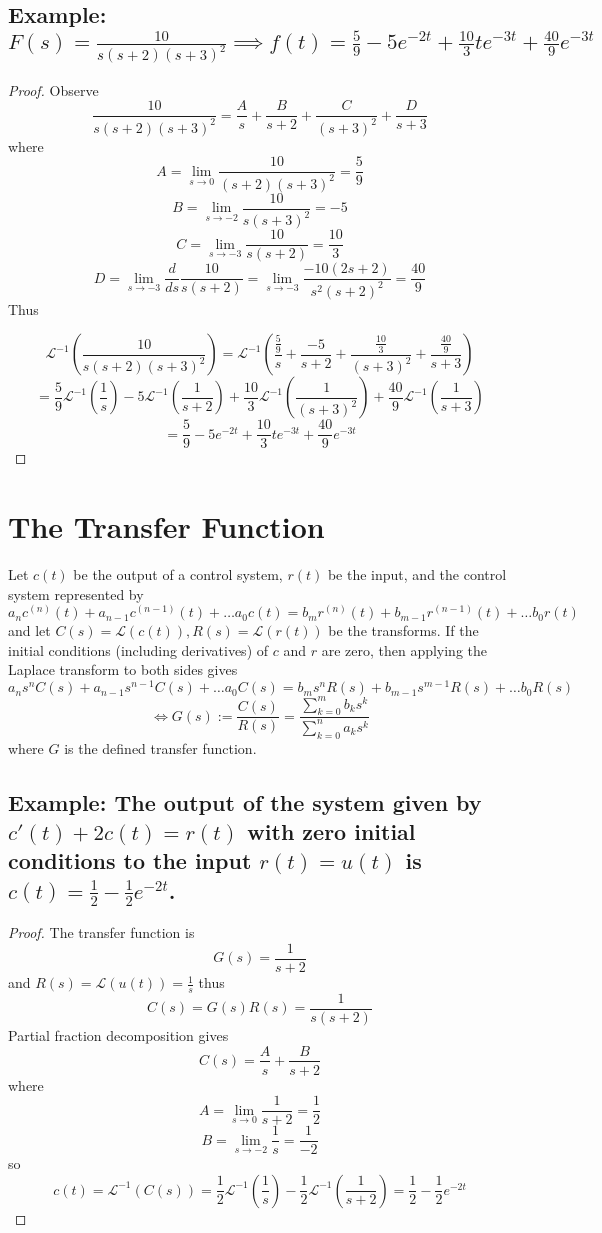 \documentclass[11pt]{article}
\begin{document}
\subsection{Example: $F(s) = \frac{10}{s(s + 2)(s + 3)^2} \implies f(t) = \frac{5}{9} - 5e^{-2t} + \frac{10}{3}te^{-3t} + \frac{40}{9}e^{-3t}$}
\begin{proof}
	Observe
	\[\frac{10}{s(s + 2)(s + 3)^2} = \frac{A}{s} + \frac{B}{s + 2} + \frac{C}{(s + 3)^2} + \frac{D}{s + 3}\] where
	\[A = \lim_{s \to 0} \frac{10}{(s + 2)(s + 3)^2} = \frac{5}{9}\]
	\[B = \lim_{s \to -2} \frac{10}{s(s + 3)^2} = -5\]
	\[C = \lim_{s \to -3}  \frac{10}{s(s + 2)} = \frac{10}{3} \]
	\[D = \lim_{s \to -3} \frac{d}{ds} \frac{10}{s(s + 2)} = \lim_{s \to -3}  \frac{-10(2s + 2)}{s^2(s + 2)^2}  = \frac{40}{9}\]
	Thus 
	
	\[\mathcal{L}^{-1}(\frac{10}{s(s + 2)(s + 3)^2}) = \mathcal{L}^{-1} \left(\frac{\frac{5}{9}}{s} + \frac{-5}{s + 2} + \frac{\frac{10}{3}}{(s + 3)^2} + \frac{\frac{40}{9}}{s + 3}\right)\]
	\[= \frac{5}{9}\mathcal{L}^{-1} \left( \frac{1}{s}\right) - 5 \mathcal{L}^{-1} \left( \frac{1}{s + 2}\right) + \frac{10}{3} \mathcal{L}^{-1} \left( \frac{1}{(s + 3)^2} \right) + \frac{40}{9}\mathcal{L}^{-1} \left( \frac{1}{s + 3}\right) \]
	\[= \frac{5}{9} - 5e^{-2t} + \frac{10}{3}te^{-3t} + \frac{40}{9}e^{-3t}\]
	
\end{proof}

\clearpage
\section{The Transfer Function}
Let $c(t)$ be the output of a control system, $r(t)$ be the input, and the control system represented by 
\[a_n c^{(n)}(t) + a_{n - 1}c^{(n - 1)}(t) + \ldots a_0c(t) =  b_m r^{(n)}(t) + b_{m - 1}r^{(n - 1)}(t) + \ldots b_0r(t)\] and let $C(s) = \mathcal{L}(c(t)), R(s) = \mathcal{L}(r(t))$ be the transforms. If the initial conditions (including derivatives) of $c$ and $r$ are zero, then applying the Laplace transform to both sides gives
\[a_n s^n C(s) + a_{n - 1}s^{n - 1}C(s) + \ldots a_0C(s) = b_m s^n R(s) + b_{m - 1}s^{m - 1}R(s) + \ldots b_0 R(s)\]
\[\iff G(s) := \frac{C(s)}{R(s)} = \frac{\sum_{k = 0}^m b_k s^k}{\sum_{k = 0}^n a_k s^k}\] where $G$ is the defined transfer function. 

\subsection{Example: The output of the system given by $c'(t) + 2c(t) = r(t)$ with zero initial conditions to the input $r(t) = u(t)$ is $c(t) = \frac{1}{2} - \frac{1}{2}e^{-2t}$.}
\begin{proof}
	The transfer function is
	\[G(s) = \frac{1}{s + 2}\] and $R(s) = \mathcal{L}(u(t)) = \frac{1}{s}$ thus
	\[C(s) = G(s)R(s) = \frac{1}{s(s + 2)}\] 
	Partial fraction decomposition gives
	\[C(s) = \frac{A}{s} + \frac{B}{s + 2}\] where
	\[A = \lim_{s \to 0} \frac{1}{s + 2}  =\frac{1}{2}\]
	\[B = \lim_{s \to -2} \frac{1}{s} = \frac{1}{-2}\] so
	\[c(t) = \mathcal{L}^{-1}(C(s)) = \frac{1}{2}\mathcal{L}^{-1}(\frac{1}{s}) - \frac{1}{2} \mathcal{L}^{-1}(\frac{1}{s + 2}) = \frac{1}{2} - \frac{1}{2}e^{-2t}\]
\end{proof}
\end{document}
